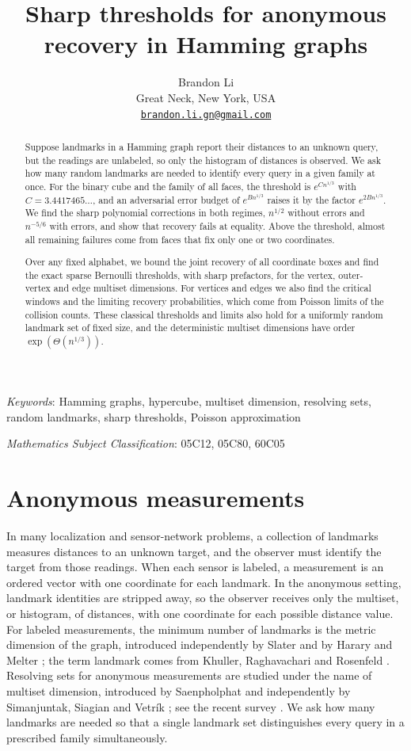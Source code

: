 \documentclass[11pt]{article}
\title{Sharp thresholds for anonymous recovery in Hamming graphs}
\author{Brandon Li\\[0.35em]
 \normalsize Great Neck, New York, USA\\[0.2em]
 \normalsize \href{mailto:brandon.li.gn@gmail.com}{\nolinkurl{brandon.li.gn@gmail.com}}}
\date{}
\theoremstyle{definition}
\begin{document}
\maketitle
\begin{abstract}
Suppose landmarks in a Hamming graph report their distances to an unknown query, but the readings are unlabeled, so only the histogram of distances is observed. We ask how many random landmarks are needed to identify every query in a given family at once. For the binary cube and the family of all faces, the threshold is \(e^{Cn^{1/3}}\) with \(C=3.4417465\ldots\), and an adversarial error budget of \(e^{Bn^{1/3}}\) raises it by the factor \(e^{2Bn^{1/3}}\). We find the sharp polynomial corrections in both regimes, \(n^{1/2}\) without errors and \(n^{-5/6}\) with errors, and show that recovery fails at equality. Above the threshold, almost all remaining failures come from faces that fix only one or two coordinates.

Over any fixed alphabet, we bound the joint recovery of all coordinate boxes and find the exact sparse Bernoulli thresholds, with sharp prefactors, for the vertex, outer-vertex and edge multiset dimensions. For vertices and edges we also find the critical windows and the limiting recovery probabilities, which come from Poisson limits of the collision counts. These classical thresholds and limits also hold for a uniformly random landmark set of fixed size, and the deterministic multiset dimensions have order \(\exp(\Theta(n^{1/3}))\).
\end{abstract}

\noindent\textit{Keywords}: Hamming graphs, hypercube, multiset dimension, resolving sets, random landmarks, sharp thresholds, Poisson approximation

\noindent\textit{Mathematics Subject Classification}: 05C12, 05C80, 60C05

\section{Anonymous measurements}
In many localization and sensor-network problems, a collection of landmarks measures distances to an unknown target, and the observer must identify the target from those readings. When each sensor is labeled, a measurement is an ordered vector with one coordinate for each landmark. In the anonymous setting, landmark identities are stripped away, so the observer receives only the multiset, or histogram, of distances, with one coordinate for each possible distance value. For labeled measurements, the minimum number of landmarks is the metric dimension of the graph, introduced independently by Slater \cite{Slater} and by Harary and Melter \cite{HM}; the term landmark comes from Khuller, Raghavachari and Rosenfeld \cite{KRR}. Resolving sets for anonymous measurements are studied under the name of multiset dimension, introduced by Saenpholphat \cite{Saenpholphat} and independently by Simanjuntak, Siagian and Vetr\'ik \cite{SSV}; see the recent survey \cite{FKKY}. We ask how many landmarks are needed so that a single landmark set distinguishes every query in a prescribed family simultaneously.
\end{document}
